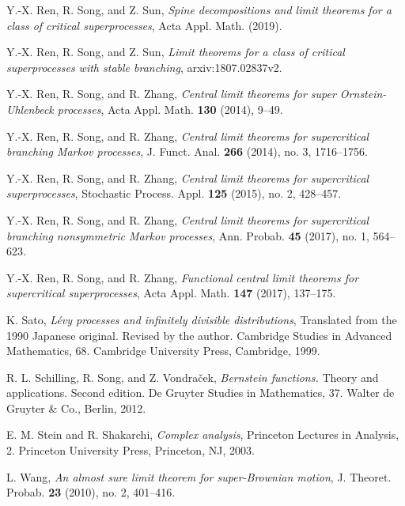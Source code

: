 \documentclass[EJP]{ejpecp} %
\begin{document}
\begin{thebibliography}{10}
  	Y.-X. Ren, R. Song, and Z. Sun,
  	\emph{Spine decompositions and limit theorems for a class of critical superprocesses},
  	Acta Appl. Math. (2019).

  	Y.-X. Ren, R. Song, and Z. Sun,
  	\emph{Limit theorems for a class of critical superprocesses with stable branching},
  	arxiv:1807.02837v2.

  	Y.-X. Ren, R. Song, and R. Zhang,
  	\emph{Central limit theorems for super {O}rnstein-{U}hlenbeck processes},
  	Acta Appl. Math. \textbf{130} (2014), 9--49.

  	Y.-X. Ren, R. Song, and R. Zhang,
  	\emph{Central limit theorems for supercritical branching {M}arkov processes},
  	J. Funct. Anal. \textbf{266} (2014), no. 3, 1716--1756.

  	Y.-X. Ren, R. Song, and R. Zhang,
  	\emph{Central limit theorems for supercritical superprocesses},
  	Stochastic Process. Appl. \textbf{125} (2015), no. 2, 428--457.

  	Y.-X. Ren, R. Song, and R. Zhang,
  	\emph{Central limit theorems for supercritical branching nonsymmetric {M}arkov processes},
  	Ann. Probab. \textbf{45} (2017), no. 1, 564--623.

  	Y.-X. Ren, R. Song, and R. Zhang,
  	\emph{Functional central limit theorems for supercritical superprocesses},
  	Acta Appl. Math. \textbf{147} (2017), 137--175.

  	K. Sato,
  	\emph{L{\'e}vy processes and infinitely divisible distributions},
  	Translated from the 1990 Japanese original. Revised by the author. Cambridge Studies in Advanced Mathematics, 68. Cambridge University Press, Cambridge, 1999.

  	R. L. Schilling, R. Song, and Z. Vondra\v{c}ek,
  	\emph{Bernstein functions.}
  	Theory and applications. Second edition. De Gruyter Studies in Mathematics, 37. Walter de Gruyter \& Co., Berlin, 2012.

  	E. M. Stein and R. Shakarchi, 
  	\emph{Complex analysis},
  	Princeton Lectures in Analysis, 2. Princeton University Press, Princeton, NJ, 2003.

  	L. Wang, 
  	\emph{An almost sure limit theorem for super-{B}rownian motion},
  	J. Theoret. Probab. \textbf{23} (2010), no. 2, 401--416.

\end{thebibliography}
\end{document}
